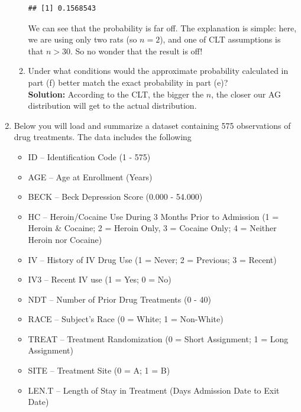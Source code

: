\documentclass{article}\usepackage[]{graphicx}\usepackage[]{color}
\makeatletter
\newenvironment{kframe}{%
 \def\at@end@of@kframe{}%
 \ifinner\ifhmode%
  \def\at@end@of@kframe{\end{minipage}}%
  \begin{minipage}{\columnwidth}%
 \fi\fi%
 \def\FrameCommand##1{\hskip\@totalleftmargin \hskip-\fboxsep
 \colorbox{shadecolor}{##1}\hskip-\fboxsep
     \hskip-\linewidth \hskip-\@totalleftmargin \hskip\columnwidth}%
 \MakeFramed {\advance\hsize-\width
   \@totalleftmargin\z@ \linewidth\hsize
   \@setminipage}}%
 {\par\unskip\endMakeFramed%
 \at@end@of@kframe}
\newenvironment{knitrout}{}{} %
\makeatother
\begin{document}
\begin{enumerate}
\begin{enumerate}
\begin{knitrout}
\begin{kframe}
\begin{alltt}
\end{alltt}
\begin{verbatim}
## [1] 0.1568543
\end{verbatim}
\end{kframe}
\end{knitrout}
We can see that the probability is far off. The explanation is simple: here, we are using only two rats (so $n=2$), and one of CLT assumptions is that $n>30$. So no wonder that the result is off! 
\item Under what conditions would the approximate probability calculated in 
part (f) better match the exact probability in part (e)?\\
\textbf{Solution:} According to the CLT, the bigger the $n$, the closer our AG distribution will get to the actual distribution.
  \end{enumerate}
\newpage
\item Below you will load and summarize a dataset 
  containing 575 observations of drug treatments. The data includes the following
  \begin{itemize}
    \item ID --	Identification Code	(1 - 575)
    \item AGE	-- Age at Enrollment	(Years)
    \item BECK -- Beck Depression Score	(0.000 - 54.000)
    \item HC --	Heroin/Cocaine Use During	3 Months Prior to Admission (1 = Heroin
    \& Cocaine; 2 = Heroin Only, 3 = Cocaine Only; 4 = Neither Heroin nor Cocaine)
    \item IV -- History of IV Drug Use	(1 = Never; 2 = Previous; 3 = Recent)
    \item IV3	-- Recent IV use	(1 = Yes; 0 = No)
    \item NDT -- Number of Prior Drug Treatments (0 - 40)
    \item RACE -- Subject's Race	(0 = White; 1 = Non-White)
\item TREAT -- Treatment Randomization (0 = Short Assignment;	1 = Long Assignment)
\item SITE -- Treatment Site (0 = A; 1 = B)
\item LEN.T	-- Length of Stay in Treatment (Days Admission Date to Exit Date)	

\end{itemize}
\end{enumerate}
\end{document}
